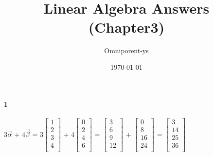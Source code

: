 \documentclass{ctexart}
\title{Linear Algebra Answers (Chapter3)}
\author{Omniporent-ys}
\date{\today}
\begin{document}
\maketitle
    \paragraph{1}
        \begin{mdframed}
        3$\vec{\alpha}$ + 4$\vec{\beta}$
        = 3$\begin{bmatrix}
            1 \\
            2 \\
            3 \\
            4\\           
            \end{bmatrix}$
            + 4$\begin{bmatrix}
            0 \\
            2 \\
            4 \\
            6 \\           
            \end{bmatrix}$
            = $\begin{bmatrix}
            3 \\
            6 \\
            9 \\
            12 \\           
            \end{bmatrix}$
            +
            $\begin{bmatrix}
            0 \\
            8 \\
            16 \\
            24 \\           
            \end{bmatrix}$
            = 
            $\begin{bmatrix}
            3 \\
            14 \\
            25 \\
            36 \\           
            \end{bmatrix}$
        \end{mdframed}
\end{document}

